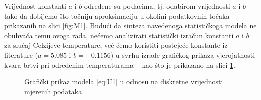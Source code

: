 \documentclass[a4paper,12pt,oneside]{memoir}
\newcommand{\pgfmathparseFPU}[1]{\begingroup%
\pgfkeys{/pgf/fpu,/pgf/fpu/output format=fixed}%
\pgfmathparse{#1}%
\pgfmathsmuggle\pgfmathresult\endgroup}
\begin{document}
            Vrijednost konstanti $a$ i $b$ određene su podacima, tj. odabirom vrijednosti $a$ i $b$ tako da dobijemo što točniju aproksimaciju u okolini podatkovnih točaka prikazanih na slici \ref{fig:M1}. Budući da sinteza navedenoga statističkoga modela ne obuhvaća temu ovoga rada, nećemo analizirati statistički izračun konstanti $a$ i $b$ za slučaj Celzijeve temperature, već ćemo koristiti postejeće konstante iz literature ($a=5.085$ i $b=-0.1156$)\cite{Dekking} u svrhu izrade grafičkog prikaza vjerojatnosti kvara brtvi pri određenim temperaturama -- kao što je prikazano na slici \ref{fig:M2}.
            
            \begin{figure}[H]
                \centering
                \caption{Grafički prikaz modela \eqref{eq:U1} u odnosu na diskretne vrijednosti mjerenih podataka \cite{Dekking}}
                \label{fig:M2}
            \end{figure}
\end{document}
